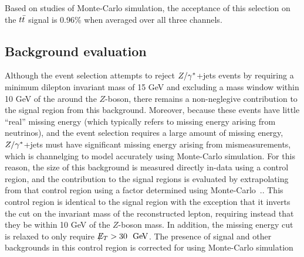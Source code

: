 
Based on studies of Monte-Carlo simulation, the acceptance of this selection
on the $t\bar{t}$ signal is 0.96\% when averaged over all three channels.



\subsection{Background evaluation}
\label{s:backgrounds}

Although the event selection attempts to reject $Z/\gamma^{*}$+jets events by requiring a minimum dilepton invariant mass of 15 GeV and excluding a
mass window within 10 GeV of the around the $Z$-boson, there remains a non-neglegive contribution to the signal region from this background.
Moreover, because these events have little ``real'' missing energy (which typically refers to missing energy arising from neutrinos),
and the event selection requires a large amount of missing energy, $Z/\gamma^{*}$+jets must have significant missing energy arising
from mismeasurements, which is channelging to model accurately using Monte-Carlo simulation.
For this reason, the size of this background is measured directly in-data using a control region, and the  contribution to the signal regions
is evaluated by extrapolating from that control region using a factor determined using Monte-Carlo~\cite{ATL-CONF-2011-034}..
This control region is identical to the signal region with the exception that it inverts the cut on the invariant mass of the reconstructed
lepton, requiring instead that they be within 10 GeV of the $Z$-boson mass.
In addition, the missing energy cut is relaxed to only require $\met>30~\GeV$.
The presence of signal and other backgrounds in this control region is corrected for using
Monte-Carlo simulation



